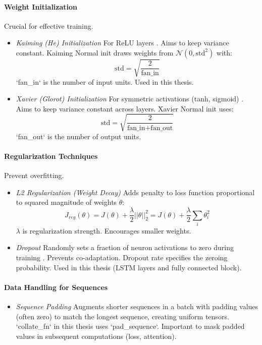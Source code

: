 \begin{appendices}
  \paragraph{Weight Initialization} Crucial for effective training.
  \begin{itemize}
    \item \textit{Kaiming (He) Initialization} For ReLU layers \autocite{he2015delving}. Aims to keep variance constant. Kaiming Normal init draws weights from $ \mathcal{N}(0, \text{std}^2) $ with:
          \begin{equation}
            \text{std} = \sqrt{\frac{2}{\text{fan\_in}}}
          \end{equation}
          `fan\_in` is the number of input units. Used in this thesis.
    \item \textit{Xavier (Glorot) Initialization} For symmetric activations (tanh, sigmoid) \autocite{glorot2010understanding}. Aims to keep variance constant across layers. Xavier Normal init uses:
          \begin{equation}
            \text{std} = \sqrt{\frac{2}{\text{fan\_in} + \text{fan\_out}}}
          \end{equation}
          `fan\_out` is the number of output units.
  \end{itemize}

  \paragraph{Regularization Techniques} Prevent overfitting.
  \begin{itemize}
    \item \textit{L2 Regularization (Weight Decay)} Adds penalty to loss function proportional to squared magnitude of weights $ \theta $:
          \begin{equation}
            J_{reg}(\theta) = J(\theta) + \frac{\lambda}{2} ||\theta||_2^2 = J(\theta) + \frac{\lambda}{2} \sum_i \theta_i^2
          \end{equation}
          $ \lambda $ is regularization strength. Encourages smaller weights.
    \item \textit{Dropout} Randomly sets a fraction of neuron activations to zero during training \autocite{srivastava2014dropout}. Prevents co-adaptation. Dropout rate specifies the zeroing probability. Used in this thesis (LSTM layers and fully connected block).
  \end{itemize}

  \paragraph{Data Handling for Sequences}
  \begin{itemize}
    \item \textit{Sequence Padding} Augments shorter sequences in a batch with padding values (often zero) to match the longest sequence, creating uniform tensors. `collate\_fn` in this thesis uses `pad\_sequence`. Important to mask padded values in subsequent computations (loss, attention).
  \end{itemize}



\end{appendices}
